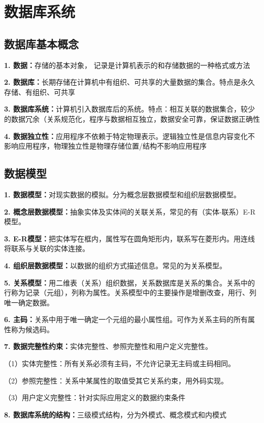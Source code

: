 \chapter{数据库系统}

\section{数据库基本概念}

\textbf{1. 数据：}存储的基本对象， 记录是计算机表示的和存储数据的一种格式或方法

\textbf{2. 数据库：}长期存储在计算机中有组织、可共享的大量数据的集合。特点是永久存储、有组织、可共享

\textbf{3. 数据库系统：}计算机引入数据库后的系统。特点：相互关联的数据集合，较少的数据冗余（关系规范化，程序与数据相互独立，数据安全可靠，保证数据正确性

\textbf{4. 数据独立性：}应用程序不依赖于特定物理表示。逻辑独立性是信息内容变化不影响应用程序，物理独立性是物理存储位置/结构不影响应用程序

\section{数据模型}

\textbf{1. 数据模型：}对现实数据的模拟。分为概念层数据模型和组织层数据模型。

\textbf{2. 概念层数据模型：}抽象实体及实体间的关联关系，常见的有（实体-联系）E-R模型。

\textbf{3. E-R模型：}把实体写在框内，属性写在圆角矩形内，联系写在菱形内。用连线将联系与关联的实体连接。

\textbf{4. 组织层数据模型：}以数据的组织方式描述信息。常见的为关系模型。

\textbf{5. 关系模型：}用二维表（关系）组织数据，关系数据库是关系的集合。关系中的行称为记录（元组），列称为属性。关系模型中的主要操作是增删改查，用行、列唯一确定数据。

\textbf{6. 主码：}关系中用于唯一确定一个元组的最小属性组。可作为关系主码的所有属性称为候选码。

\textbf{7. 数据完整性约束：}实体完整性、参照完整性和用户定义完整性。

\quad（1）实体完整性：所有关系必须有主码，不允许记录无主码或主码相同。

\quad（2）参照完整性：关系中某属性的取值受其它关系约束，用外码实现。

\quad（3）用户定义完整性：针对实际应用定义的数据约束条件

\textbf{8. 数据库系统的结构：}三级模式结构，分为外模式、概念模式和内模式

